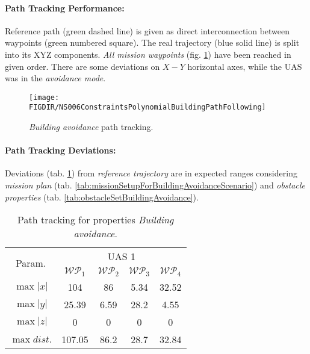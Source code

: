 \noindent\paragraph{Path Tracking Performance:} Reference path (green dashed line) is given as direct interconnection between waypoints (green numbered square).  The real trajectory (blue solid line) is split into its XYZ components. \emph{All mission waypoints} (fig. \ref{fig:testCaseBuildingAvoidancePathTracking}) have been reached in given order. There are some deviations on $X-Y$ horizontal axes, while the UAS was in the \emph{avoidance mode}.

\begin{figure}[H]
	\centering
	\texttt{[image: \\FIGDIR/NS006ConstraintsPolynomialBuildingPathFollowing]} 
	\caption{\emph{Building avoidance} path tracking.}
	\label{fig:testCaseBuildingAvoidancePathTracking}
\end{figure}



\noindent\paragraph{Path Tracking Deviations:} Deviations (tab. \ref{tab:pathTrackingParametersForBuildingAvoidance}) from \emph{reference trajectory} are in expected ranges considering \emph{mission plan} (tab. \ref{tab:missionSetupForBuildingAvoidanceScenario}) and \emph{obstacle properties} (tab. \ref{tab:obstacleSetBuildingAvoidance}).
\begin{table}[H]
	\centering
	\begin{tabular}{c||c|c|c|c}
		\multirow{2}{*}{Param.} & \multicolumn{4}{c}{UAS 1} \\\cline{2-5}
						& $\mathscr{WP}_1$  & $\mathscr{WP_2}$  & $\mathscr{WP}_3$  & $\mathscr{WP}_4$  \\\hline\hline
		  $\max |x|$    & 104      & 86      & 5.34       & 32.52 \\\hline
		  $\max |y|$    & 25.39      & 6.59       & 28.2      & 4.55 \\\hline
		  $\max |z|$    & 0      & 0      &   0    & 0 \\\hline
		  $\max dist.$  & 107.05       & 86.2      & 28.7       & 32.84 \\
	\end{tabular}
	\caption{Path tracking for properties \emph{Building avoidance}.}
	\label{tab:pathTrackingParametersForBuildingAvoidance}
\end{table}
  


